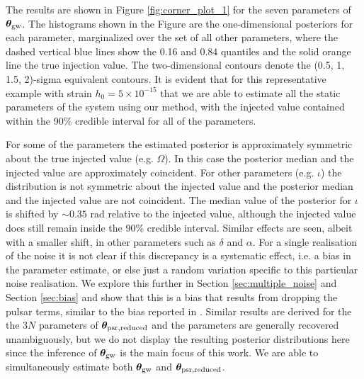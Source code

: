 \documentclass[fleqn,usenatbib,useAMS]{mnras}
\begin{document}
 The results are shown in Figure \ref{fig:corner_plot_1} for the seven parameters of  $\boldsymbol{\theta}_{\rm gw}$. The histograms shown in the Figure are the one-dimensional posteriors for each parameter, marginalized over the set of all other parameters, where the dashed vertical blue lines show the 0.16 and 0.84 quantiles and the solid orange line the true injection value. The two-dimensional contours denote the (0.5, 1, 1.5, 2)-sigma equivalent contours. It is evident that for this representative example with strain $h_0 = 5 \times 10^{-15}$ that we are able to estimate all the static parameters of the system using our method, with the injected value contained within the 90\% credible interval for all of the parameters. 
 
 
 
 

 For some of the parameters the estimated posterior is approximately symmetric about the true injected value (e.g. $\Omega$). In this case the posterior median and the injected value are approximately coincident. For other parameters (e.g. $\iota$) the distribution is not symmetric about the injected value and the posterior median and the injected value are not coincident. The median value of the posterior for $\iota$ is shifted by $\sim 0.35$ rad relative to the injected value, although the injected value does still remain inside the 90\% credible interval. Similar effects are seen, albeit with a smaller shift, in other parameters such as $\delta$ and $\alpha$. For a single realisation of the noise it is not clear if this discrepancy is a systematic effect, i.e. a bias in the parameter estimate, or else just a random variation specific to this particular noise realisation. We explore this further in Section \ref{sec:multiple_noise} and Section \ref{sec:bias} and show that this is a bias that results from dropping the pulsar terms, similar to the bias reported in \cite{Zhupulsarterms}. Similar results are derived for the the 3$N$ parameters of $\boldsymbol{\theta}_{\rm psr, reduced}$ and the parameters are generally recovered unambiguously, but we do not display the resulting posterior distributions here since the inference of $\boldsymbol{\theta}_{\rm gw}$ is the main focus of this work. We are able to simultaneously estimate both $\boldsymbol{\theta}_{\rm gw}$ and $\boldsymbol{\theta}_{\rm psr, reduced}$. 
 
\end{document}

